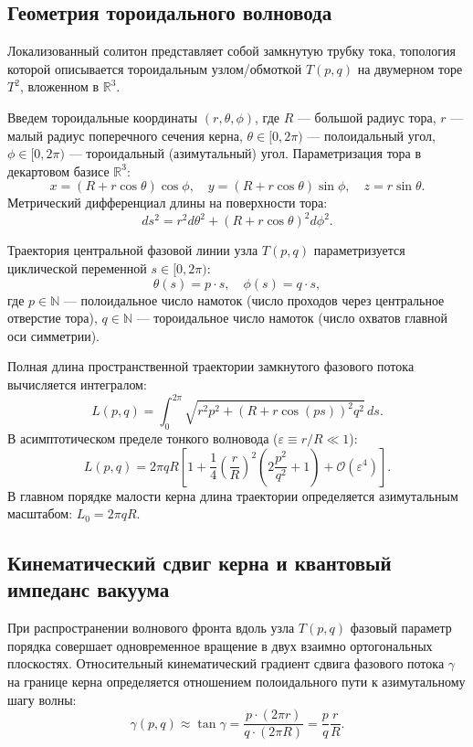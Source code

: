 \documentclass[12pt,a4paper]{article}
\begin{document}
	\subsection{Геометрия тороидального волновода}
	Локализованный солитон представляет собой замкнутую трубку тока, топология которой описывается тороидальным узлом/обмоткой $T(p,q)$ на двумерном торе $T^2$, вложенном в $\mathbb{R}^3$.
	
	Введем тороидальные координаты $(r, \theta, \phi)$, где $R$ --- большой радиус тора, $r$ --- малый радиус поперечного сечения керна, $\theta \in [0, 2\pi)$ --- полоидальный угол, $\phi \in [0, 2\pi)$ --- тороидальный (азимутальный) угол. Параметризация тора в декартовом базисе $\mathbb{R}^3$:
	\begin{equation}
		x = (R + r \cos\theta) \cos\phi, \quad y = (R + r \cos\theta) \sin\phi, \quad z = r \sin\theta.
	\end{equation}
	Метрический дифференциал длины на поверхности тора:
	\begin{equation}
		ds^2 = r^2 d\theta^2 + (R + r \cos\theta)^2 d\phi^2.
	\end{equation}
	
	Траектория центральной фазовой линии узла $T(p,q)$ параметризуется циклической переменной $s \in [0, 2\pi)$:
	\begin{equation}
		\theta(s) = p \cdot s, \quad \phi(s) = q \cdot s,
	\end{equation}
	где $p \in \mathbb{N}$ --- полоидальное число намоток (число проходов через центральное отверстие тора), $q \in \mathbb{N}$ --- тороидальное число намоток (число охватов главной оси симметрии).
	
	Полная длина пространственной траектории замкнутого фазового потока вычисляется интегралом:
	\begin{equation}
		L(p,q) = \int_0^{2\pi} \sqrt{r^2 p^2 + (R + r \cos(ps))^2 q^2} \, ds.
	\end{equation}
	В асимптотическом пределе тонкого волновода ($\varepsilon \equiv r/R \ll 1$):
	\begin{equation}
		L(p,q) = 2\pi q R \left[ 1 + \frac{1}{4} \left(\frac{r}{R}\right)^2 \left( 2\frac{p^2}{q^2} + 1 \right) + \mathcal{O}(\varepsilon^4) \right].
	\end{equation}
	В главном порядке малости керна длина траектории определяется азимутальным масштабом: $L_0 = 2\pi q R$.
	
	\subsection{Кинематический сдвиг керна и квантовый импеданс вакуума}
	При распространении волнового фронта вдоль узла $T(p,q)$ фазовый параметр порядка совершает одновременное вращение в двух взаимно ортогональных плоскостях. Относительный кинематический градиент сдвига фазового потока $\gamma$ на границе керна определяется отношением полоидального пути к азимутальному шагу волны:
	\begin{equation}
		\gamma(p,q) \approx \tan\gamma = \frac{p \cdot (2\pi r)}{q \cdot (2\pi R)} = \frac{p}{q} \frac{r}{R}.
	\end{equation}
	
\end{document}
